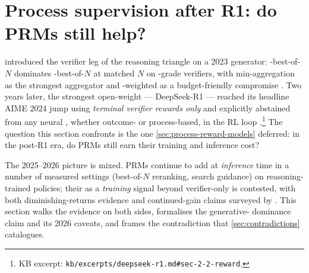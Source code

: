
\section{Process supervision after R1: do PRMs still help?}
\label{sec:prm-survival}
\label{sec:prm-after-r1}

 introduced the verifier leg of the
reasoning triangle on a 2023 generator: -best-of-$N$ dominates
-best-of-$N$ at matched $N$ on -grade verifiers, with
min-aggregation as the strongest aggregator and -weighted
 as a budget-friendly compromise
\citep[\S 4]{lightman2023-prm800k}. Two years later, the strongest
open-weight  --- DeepSeek-R1 --- reached its headline
AIME 2024 jump using \emph{terminal verifier rewards only} and
explicitly abstained from any neural , whether outcome- or
process-based, in the RL loop \citep[\S 2.2]{deepseek-r1}.\footnote{KB
excerpt: \texttt{kb/excerpts/deepseek-r1.md\#sec-2-2-reward}.} The
question this section confronts is the one \cref{sec:process-reward-models}
deferred: in the post-R1 era, do PRMs still earn their training
and inference cost?

The 2025--2026 picture is mixed. PRMs continue to add  at
\emph{inference} time in a number of measured settings (best-of-$N$
reranking, search guidance) on reasoning-trained policies; their 
as a \emph{training} signal beyond verifier-only  is contested,
with both diminishing-returns evidence and continued-gain claims
surveyed by \citet{zheng2025-prm-survey}.
This section walks the evidence on both sides, formalises the
generative- dominance claim and its 2026 caveats, and frames the
contradiction that \cref{sec:contradictions} catalogues.

